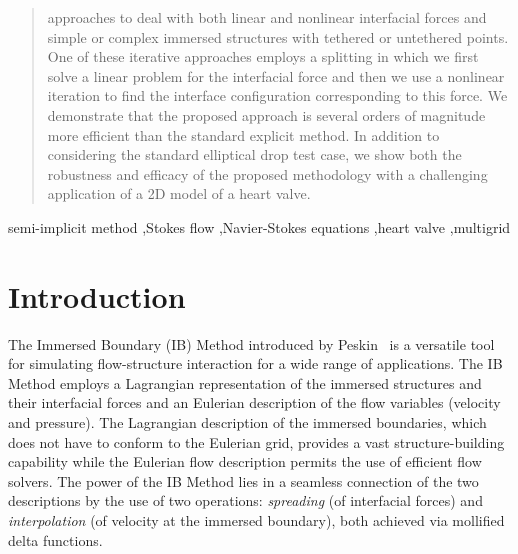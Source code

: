 \documentclass[preprint,12pt]{elsarticle}
\begin{document}
\begin{frontmatter}
\begin{abstract}
approaches to deal with both linear and nonlinear interfacial forces and simple or complex immersed structures with tethered or untethered points.  One of these iterative approaches employs a splitting in which 
we first solve a linear problem  for the interfacial force and then we use a nonlinear iteration to find the interface configuration corresponding to this force.  We demonstrate that the proposed approach is several orders of magnitude more efficient than the standard explicit method. In addition to considering the standard elliptical drop test case, we show both the robustness and efficacy of the proposed methodology with a challenging application of a 2D model of a heart valve.
\end{abstract}

\begin{keyword}
semi-implicit method \sep Stokes flow \sep Navier-Stokes equations \sep heart valve \sep multigrid


\end{keyword}

\end{frontmatter}

\section{Introduction}
The Immersed Boundary (IB) Method introduced by Peskin~\cite{Peskin77} is a versatile tool for simulating flow-structure interaction for a wide range of applications.  The IB Method employs a Lagrangian representation of 
the immersed structures and their interfacial forces and an Eulerian description of the 
flow variables (velocity and pressure).  The Lagrangian description of the immersed boundaries, which does not have to conform to the Eulerian grid,  provides a vast structure-building capability while the Eulerian flow description permits the use of efficient flow solvers.
The power of the IB Method lies in a seamless connection of the two descriptions by the use of two operations: 
{\em spreading} (of interfacial forces) and {\em interpolation} (of velocity at the immersed boundary), both achieved via mollified delta functions. 
  
\end{document}
